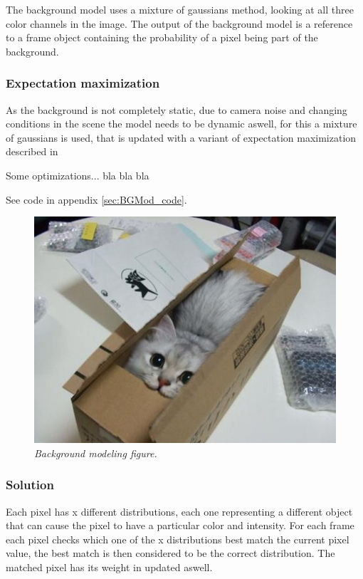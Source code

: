 The background model uses a mixture of gaussians method, looking at all three color channels in the image. The output of the background model is a reference to a frame object containing the probability of a pixel being part of the background.

\subsubsection{Expectation maximization}

As the background is not completely static, due to camera noise and changing conditions in the scene the model needs to be dynamic aswell, for this a mixture of gaussians is used, that is updated with a variant of expectation maximization described in \cite{wood}

Some optimizations... bla bla bla

See code in appendix \ref{sec:BGMod_code}. %

\begin{figure}[htb]
	\centering
	\includegraphics[width=\linewidth]{images/acatisfinetoo}
	\caption{\textit{Background modeling figure.}}
	\label{fig:BGModeling_fig} %
\end{figure}

\subsubsection{Solution}

Each pixel has x different distributions, each one representing a different object that can cause the pixel to have a particular color and intensity. For each frame each pixel checks which one of the x distributions best match the current pixel value, the best match is then considered to be the correct distribution. The matched pixel has its weight in updated aswell. 

